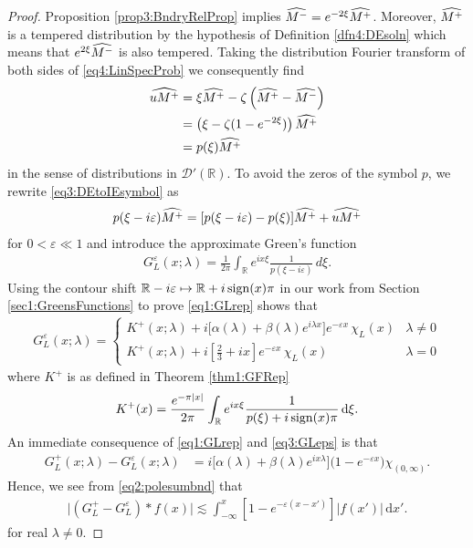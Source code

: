 \documentclass[../dissertation.tex]{subfiles}
\begin{document}
\begin{proof}
	Proposition \ref{prop3:BndryRelProp} implies 
	$\widehat{M^-} = e^{-2\xi} \widehat{M^+}$. Moreover, $\widehat{M^+}$ is a tempered 
	distribution by the hypothesis of Definition \ref{dfn4:DEsoln} which means
	that $e^{2\xi} \widehat{M^-}$ is also tempered. Taking the distribution Fourier
	transform of both sides of \eqref{eq4:LinSpecProb} we consequently find
	\begin{align}\label{eq3:DEtoIEsymbol}
		\widehat{uM^+} 
			&= \xi \widehat{M^+} - \zeta\left( \widehat{M^+} - \widehat{M^-} \right) \\
			&= \left(\xi - \zeta(1-e^{-2\xi})\right) \widehat{M^+} \nonumber \\
			&= p(\xi) \widehat{M^+} \nonumber 
	\end{align}
	in the sense of distributions in $\mathcal D'(\mathbb R)$. To avoid the 
	zeros of the symbol $p$, we rewrite \eqref{eq3:DEtoIEsymbol} as 
	\begin{align}\label{eq3:peps}
		p(\xi - i\varepsilon) \widehat{M^+} 
			= [p(\xi - i\varepsilon) - p(\xi)] \widehat{M^+} + \widehat{uM^+}
	\end{align}
	for $0< \varepsilon \ll 1$ and introduce the approximate Green's function 
	\begin{align}\label{eq4:approxGF}
		G_L^\varepsilon(x; \lambda) 
			= \frac{1}{2\pi} 
				\int_{\mathbb R} 
					e^{ix\xi} \frac{1}{p(\xi - i \varepsilon)}
				\,d\xi.
	\end{align}
	Using the contour shift 
	$\mathbb R-i\varepsilon \mapsto \mathbb R + i \operatorname{sign}(x) \pi$
	in our work from Section \ref{sec1:GreensFunctions} to prove
	\eqref{eq1:GLrep} shows that
	\begin{align}\label{eq3:GLeps}
		G_L^\varepsilon(x; \lambda)
			=
				\begin{cases}
					K^+(x; \lambda) 
						+ i
						\big[ 
							\alpha(\lambda) 
							+ \beta(\lambda) e^{i\lambda x}
						\big] e^{-\varepsilon x} \, \chi_L(x)
						& \lambda \ne 0 \\
					K^+(x; \lambda) 
						+ i
						\left[ 
							\frac{2}{3} + i x
						\right] e^{-\varepsilon x} \, \chi_L(x)
						& \lambda = 0
				\end{cases}
	\end{align}
	where $K^+$ is as defined in Theorem \ref{thm1:GFRep}
	\[
		K^+(x) 
			= \frac{e^{-\pi|x|}}{2\pi}
				\int_{\mathbb R}
					e^{ix\xi}
					\frac{1}{p(\xi)+i \operatorname{sign}(x) \pi}
				\, \mathrm{d}\xi.
	\]
	An immediate consequence of \eqref{eq1:GLrep} and \eqref{eq3:GLeps} is that
	\begin{align*}
		G_L^+(x; \lambda) - G_L^\varepsilon(x; \lambda)
			&= i 
				\Big[ 
					\alpha(\lambda) 
					+ \beta(\lambda) e^{ix\lambda}
				\Big]
				\big(1-e^{-\varepsilon x}\big)
				\chi_{(0, \infty)}.
	\end{align*}
	Hence, we see from \eqref{eq2:polesumbnd} that
	\begin{align}\label{eq3:GLminusGeps}
		\big| \left(G_L^+ - G_L^\varepsilon\right)*f(x) \big|
			\lesssim \int_{-\infty}^x 
					\left[ 1 -e^{-\varepsilon(x - x')}  \right] |f(x')| 
				\, \mathrm{d}x'.
	\end{align}
	for real $\lambda\ne0$. 


\end{proof}
\end{document}

